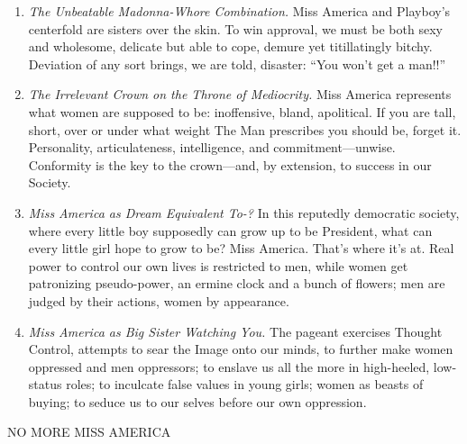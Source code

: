 \documentclass{article}
\begin{document}
\begin{enumerate}
	\item \emph{The Unbeatable Madonna-Whore Combination.} Miss America and
		Playboy's centerfold are sisters over the skin. To win approval, we
		must be both sexy and wholesome, delicate but able to cope, demure yet
		titillatingly bitchy. Deviation of any sort brings, we are told,
		disaster: ``You won't get a man!!''

	\item \emph{The Irrelevant Crown on the Throne of Mediocrity.} Miss America
		represents what women are supposed to be: inoffensive, bland,
		apolitical. If you are tall, short, over or under what weight The Man
		prescribes you should be, forget it. Personality, articulateness,
		intelligence, and commitment---unwise. Conformity is the key to the
		crown---and, by extension, to success in our Society.

	\item \emph{Miss America as Dream Equivalent To-?} In this reputedly
		democratic society, where every little boy supposedly can grow up to be
		President, what can every little girl hope to grow to be? Miss America.
		That's where it's at. Real power to control our own lives is restricted
		to men, while women get patronizing pseudo-power, an ermine clock and a
		bunch of flowers; men are judged by their actions, women by appearance.

	\item \emph{Miss America as Big Sister Watching You.} The pageant exercises
		Thought Control, attempts to sear the Image onto our minds, to further
		make women oppressed and men oppressors; to enslave us all the more in
		high-heeled, low-status roles; to inculcate false values in young
		girls; women as beasts of buying; to seduce us to our selves before our
		own oppression.
\end{enumerate}

NO MORE MISS AMERICA
\end{document}
